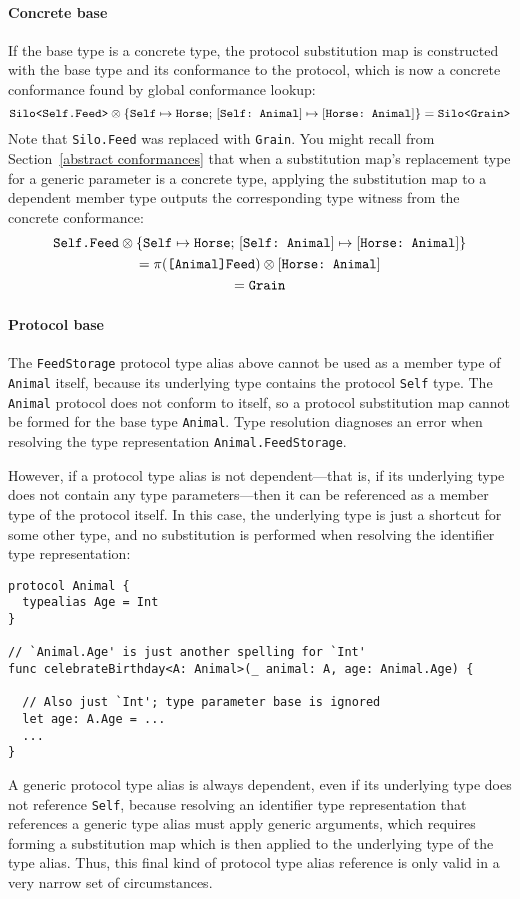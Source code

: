 \documentclass[../generics]{subfiles}
\begin{document}
\paragraph{Concrete base}
If the base type is a concrete type, the protocol substitution map is constructed with the base type and its conformance to the protocol, which is now a concrete conformance found by global conformance lookup:
\[
\texttt{Silo<Self.Feed>} \otimes \{\texttt{Self} \mapsto \texttt{Horse};\,[\texttt{Self:~Animal}] \mapsto [\texttt{Horse:~Animal}]\} = \texttt{Silo<Grain>}
\]
Note that \texttt{Silo.Feed} was replaced with \texttt{Grain}. You might recall from Section~\ref{abstract conformances} that when a substitution map's replacement type for a generic parameter is a concrete type, applying the substitution map to a dependent member type outputs the corresponding type witness from the concrete conformance:
\begin{gather*}
\texttt{Self.Feed} \otimes \{\texttt{Self} \mapsto \texttt{Horse};\,[\texttt{Self:~Animal}] \mapsto [\texttt{Horse:~Animal}]\}\\
= \pi(\texttt{[Animal]Feed}) \otimes [\texttt{Horse:~Animal}] \\
= \texttt{Grain}
\end{gather*}

\paragraph{Protocol base} The \texttt{FeedStorage} protocol type alias above cannot be used as a member type of \texttt{Animal} itself, because its underlying type contains the protocol \texttt{Self} type. The \texttt{Animal} protocol does not conform to itself, so a protocol substitution map cannot be formed for the base type \texttt{Animal}. Type resolution diagnoses an error when resolving the type representation \texttt{Animal.FeedStorage}.

However, if a protocol type alias is not dependent---that is, if its underlying type does not contain any type parameters---then it can be referenced as a member type of the protocol itself. In this case, the underlying type is just a shortcut for some other type, and no substitution is performed when resolving the identifier type representation:
\begin{Verbatim}
protocol Animal {
  typealias Age = Int
}

// `Animal.Age' is just another spelling for `Int'
func celebrateBirthday<A: Animal>(_ animal: A, age: Animal.Age) {

  // Also just `Int'; type parameter base is ignored
  let age: A.Age = ...
  ...
}
\end{Verbatim}
A generic protocol type alias is always dependent, even if its underlying type does not reference \texttt{Self}, because resolving an identifier type representation that references a generic type alias must apply generic arguments, which requires forming a substitution map which is then applied to the underlying type of the type alias. Thus, this final kind of protocol type alias reference is only valid in a very narrow set of circumstances.
\end{document}
